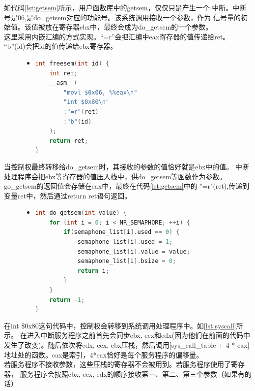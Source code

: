 \documentclass[a4paper]{article}
\begin{document}
    如代码\ref{lst:getsem}所示，用户函数库中的getsem，仅仅只是产生一个
    中断。中断号是06,是do\_getsem对应的功能号。该系统调用接收一个参数，作为
    信号量的初始值。该值被放在寄存器ebx中，最终会成为do\_getsem的一个参数。\\

    这里采用内嵌汇编的方式实现。``=r''会把汇编中eax寄存器的值传递给ret。
    ``b''(id)会把id的值传递给ebx寄存器。
    \begin{figure}[!hbt]
    \begin{itemize}
    \item[] \begin{lstlisting}[language=C, label=lst:getsem, caption=用户函数库中的getsem]
int freesem(int id) {
    int ret;
    __asm__(
        "movl $0x06, %%eax\n"
        "int $0x80\n"
        :"=r"(ret)
        :"b"(id)
    );
    return ret;
}
    \end{lstlisting}
    \end{itemize}
    \end{figure}
    当控制权最终转移给do\_getsem时，其接收的参数的值恰好就是ebx中的值。
    中断处理程序会把ebx等寄存器的值压入栈中，供do\_getsem等函数作为参数。\\ 

    go\_getsem的返回值会存储在eax中，最终在代码\ref{lst:getsem}中的
    "=r"(ret),传递到变量ret中，然后通过return ret语句返回。
\begin{figure}[!hbt]
\begin{itemize}
\item[] \begin{lstlisting}[language=C, label=lst:dogetsem, caption=do\_getsem的实现]
int do_getsem(int value) {
    for (int i = 0; i < NR_SEMAPHORE; ++i) {
        if(semaphone_list[i].used == 0) {
            semaphone_list[i].used = 1;
            semaphone_list[i].value = value;
            semaphone_list[i].bsize = 0;
            return i;
        }
    }
    return -1;
}

\end{lstlisting}
\end{itemize}
\end{figure}
    在int \$0x80这句代码中，控制权会转移到系统调用处理程序中。如\ref{lst:syscall}所示。
    在进入中断服务程序之前首先会同步ebx, ecx和edx(因为他们在前面的代码中
    发生了改变)。随后依次将edx, ecx, ebx压栈，然后调用[sys\_call\_table + 4 * eax]
    地址处的函数。eax是索引，4*eax恰好是每个服务程序的偏移量。\\ 

    若服务程序不接收参数，这些压栈的寄存器不会被用到。若服务程序使用了寄存器，
    服务程序会按照ebx, ecx, edx的顺序接收第一、第二、第三个参数（如果有的话）
\end{document}
